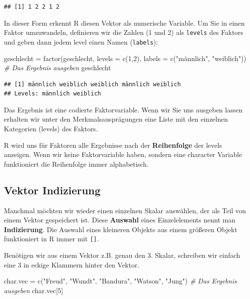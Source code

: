 \documentclass[
]{book}
\newenvironment{Shaded}{\begin{snugshade}}{\end{snugshade}}
\newcommand{\AttributeTok}[1]{\textcolor[rgb]{0.77,0.63,0.00}{#1}}
\newcommand{\CommentTok}[1]{\textcolor[rgb]{0.56,0.35,0.01}{\textit{#1}}}
\newcommand{\DecValTok}[1]{\textcolor[rgb]{0.00,0.00,0.81}{#1}}
\newcommand{\FunctionTok}[1]{\textcolor[rgb]{0.00,0.00,0.00}{#1}}
\newcommand{\NormalTok}[1]{#1}
\newcommand{\OtherTok}[1]{\textcolor[rgb]{0.56,0.35,0.01}{#1}}
\newcommand{\StringTok}[1]{\textcolor[rgb]{0.31,0.60,0.02}{#1}}
\begin{document}
\begin{verbatim}
## [1] 1 2 2 1 2
\end{verbatim}

In dieser Form erkennt R diesen Vektor als numerische Variable. Um Sie in einen Faktor umzuwandeln, definieren wir die Zahlen (1 und 2) als \texttt{levels} des Faktors und geben dann jedem level einen Namen (\texttt{labels}):

\begin{Shaded}
\begin{Highlighting}[]
\NormalTok{geschlecht }\OtherTok{=} \FunctionTok{factor}\NormalTok{(geschlecht, }\AttributeTok{levels =} \FunctionTok{c}\NormalTok{(}\DecValTok{1}\NormalTok{,}\DecValTok{2}\NormalTok{), }\AttributeTok{labels =} \FunctionTok{c}\NormalTok{(}\StringTok{"männlich"}\NormalTok{, }\StringTok{"weiblich"}\NormalTok{))}
\CommentTok{\# Das Ergebnis ausgeben}
\NormalTok{geschlecht}
\end{Highlighting}
\end{Shaded}

\begin{verbatim}
## [1] männlich weiblich weiblich männlich weiblich
## Levels: männlich weiblich
\end{verbatim}

Das Ergebnis ist eine codierte Faktorvariable. Wenn wir Sie uns ausgeben lassen erhalten wir unter den Merkmalsausprägungen eine Liste mit den einzelnen Kategorien (levels) des Faktors.

R wird uns für Faktoren alle Ergebnisse nach der \textbf{Reihenfolge} der levels anzeigen. Wenn wir keine Faktorvariable haben, sondern eine character Variable funktioniert die Reihenfolge immer alphabetisch.

\hypertarget{vektor-indizierung}{%
\subsection{Vektor Indizierung}\label{vektor-indizierung}}

Manchmal möchten wir wieder einen einzelnen Skalar auswählen, der als Teil von einem Vektor gespeichert ist. Diese \textbf{Auswahl} eines Einzelelements nennt man \textbf{Indizierung}. Die Auswahl eines kleineren Objekts aus einem größeren Objekt funktioniert in R immer mit \texttt{{[}{]}}.

Benötigen wir aus einem Vektor z.B. genau den 3. Skalar, schreiben wir einfach eine 3 in eckige Klammern hinter den Vektor.

\begin{Shaded}
\begin{Highlighting}[]
\NormalTok{char.vec }\OtherTok{=} \FunctionTok{c}\NormalTok{(}\StringTok{"Freud"}\NormalTok{, }\StringTok{"Wundt"}\NormalTok{, }\StringTok{"Bandura"}\NormalTok{, }\StringTok{"Watson"}\NormalTok{, }\StringTok{"Jung"}\NormalTok{)}
\CommentTok{\# Das Ergebnis ausgeben}
\NormalTok{char.vec[}\DecValTok{5}\NormalTok{]}
\end{Highlighting}
\end{Shaded}
\end{document}
